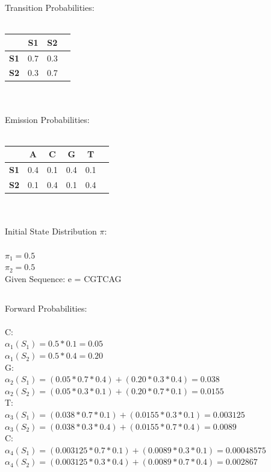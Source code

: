 \documentclass[paper=a4, fontsize=11pt]{scrartcl} %
\numberwithin{equation}{section} %
\numberwithin{figure}{section} %
\numberwithin{table}{section} %
\begin{document}
Transition Probabilities:\\\\
\begin{tabular}{l*{3}{c}}
\textbf{} & \textbf{S1} &  \textbf{S2}  \\
\hline
\textbf{S1} & 0.7 & 0.3\\
\textbf{S2} & 0.3 & 0.7
\end{tabular}\\\\


Emission Probabilities:\\\\
\begin{tabular}{l*{5}{c}}
\textbf{} & \textbf{A} &  \textbf{C} & \textbf{G} & \textbf{T} \\
\hline
\textbf{S1} & 0.4 & 0.1 & 0.4 & 0.1\\
\textbf{S2} & 0.1 & 0.4 & 0.1 & 0.4
\end{tabular}\\\\

Initial State Distribution $\pi$:\\\\
$\pi_{1} = 0.5$\\
$\pi_{2} = 0.5$\\

Given Sequence: e = CGTCAG

\subsection{}
Forward Probabilities:\\\\
C:\\
$\alpha_{1}(S_{1}) = 0.5*0.1 = 0.05$\\
$\alpha_{1}(S_{2}) = 0.5*0.4 = 0.20$\\

G:\\
$\alpha_{2}(S_{1}) = (0.05*0.7*0.4)+ (0.20*0.3*0.4)= 0.038$\\
$\alpha_{2}(S_{2}) = (0.05*0.3*0.1)+ (0.20*0.7*0.1)= 0.0155$\\

T:\\
$\alpha_{3}(S_{1}) = (0.038*0.7*0.1)+ (0.0155*0.3*0.1)= 0.003125$\\
$\alpha_{3}(S_{2}) = (0.038*0.3*0.4)+ (0.0155*0.7*0.4)= 0.0089$\\

C:\\
$\alpha_{4}(S_{1}) = (0.003125*0.7*0.1)+ (0.0089*0.3*0.1)= 0.00048575$\\
$\alpha_{4}(S_{2}) = (0.003125*0.3*0.4)+ (0.0089*0.7*0.4)= 0.002867$\\
\end{document}
